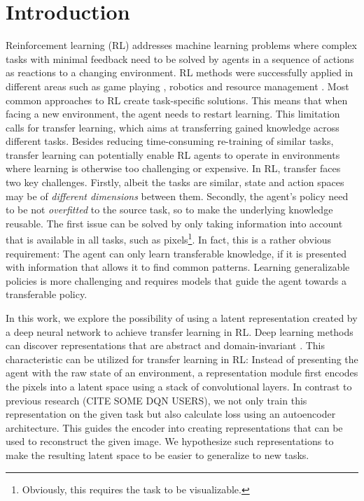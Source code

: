 \section{Introduction}
\label{sec:introduction}

Reinforcement learning (RL) addresses machine learning problems where complex tasks with minimal feedback \citep{taylor2007cross} need to be solved by agents in a sequence of actions as reactions to a changing environment. RL methods were successfully applied in different areas such as game playing \citep{silver2016mastering}, robotics \citep{levine2016end} and resource management \citep{mao2016resource}. 
Most common approaches to RL create task-specific solutions. This means that when facing a new environment, the agent needs to restart learning. This limitation calls for transfer learning, which aims at transferring gained knowledge across different tasks. Besides reducing time-consuming re-training of similar tasks, transfer learning can potentially enable RL agents to operate in environments where learning is otherwise too challenging \citep{barreto2018transfer} or expensive. In RL, transfer faces two key challenges. Firstly, albeit the tasks are similar, state and action spaces may be of \textit{different dimensions} between them. Secondly, the agent's policy need to be not \textit{overfitted} to the source task, so to make the underlying knowledge reusable. %
The first issue can be solved by only taking information into account that is available in all tasks, such as pixels\footnote{Obviously, this requires the task to be visualizable.}. In fact, this is a rather obvious requirement: The agent can only learn transferable knowledge, if it is presented with information that allows it to find common patterns. Learning generalizable policies is more challenging and requires models that guide the agent towards a transferable policy. 



In this work, we explore the possibility of using a latent representation created by a deep neural network to achieve transfer learning in RL. Deep learning methods can discover representations that are abstract and domain-invariant \citep{bengio2012deep,ganin2014unsupervised}. This characteristic can be utilized for transfer learning in RL: Instead of presenting the agent with the raw state of an environment, a representation module first encodes the pixels into a latent space using a stack of convolutional layers. In contrast to previous research (CITE SOME DQN USERS), we not only train this representation on the given task but also calculate loss using an autoencoder architecture. This guides the encoder into creating representations that can be used to reconstruct the given image. We hypothesize such representations to make the resulting latent space to be easier to generalize to new tasks.


